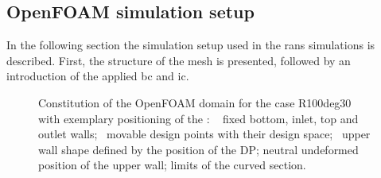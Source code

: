 \subsection{OpenFOAM simulation setup}\label{subsec: methodsOFsetup}

In the following section the simulation setup used in the \acrshort{rans} simulations is described.
First, the structure of the mesh is presented, followed by an introduction of the applied \acrshort{bc} and \acrshort{ic}.
\begin{figure}[h!]
    \centering
    
    \caption[Constitution of the OpenFOAM domain for the case R100deg30 with exemplary positioning of the \textit{design points (DP)}]{Constitution of the OpenFOAM domain for the case R100deg30 with exemplary positioning of the :
    ~ fixed bottom, inlet, top and outlet walls;
    ~movable design points with their  design space;
    ~upper wall shape defined by the position of the DP;
     neutral undeformed position of the upper wall;
     limits of the curved section.
}
    \label{fig:openfoamDomain}
\end{figure}




